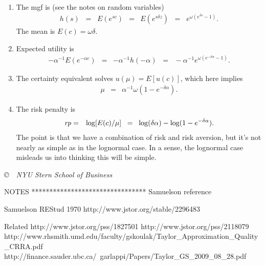 \begin{enumerate}
\begin{enumerate}
\item The mgf is (see the notes on random variables)
\begin{eqnarray*}
    h(s) \;\;=\;\;  E(e^{sc}) &=& E(e^{s\delta z}) \;\;=\;\;  e^{\omega (e^{\delta s} -1)} .
\end{eqnarray*}
The mean is $ E(c) = \omega\delta $.

\item Expected utility is
\begin{eqnarray*}
 - \alpha^{-1} E(e^{-\alpha c}) &=& - \alpha^{-1} h(-\alpha)
            \;\;=\;\; - \alpha^{-1} e^{\omega (e^{-\delta\alpha } -1)} .
\end{eqnarray*}

\item The certainty equivalent solves $u(\mu) = E[u(c)]$, which here implies
\begin{eqnarray*}
    \mu &=& \alpha^{-1} \omega (1- e^{-\delta \alpha}) .
\end{eqnarray*}

\item The risk penalty is
\begin{eqnarray*}
    \mbox{\em rp\/} &=& \log [E(c)/\mu]
            \;\;=\;\; \log (\delta \alpha) - \log (1- e^{-\delta \alpha}) .
\end{eqnarray*}
The point is that we have a combination of risk and risk aversion,
but it's not nearly as simple as in the lognormal case.
In a sense, the lognormal case misleads us into thinking this will be simple.
\end{enumerate}



\end{enumerate}



\vfill \centerline{\it \copyright \ \number\year \
NYU Stern School of Business}




NOTES
********************************
Samuelson reference

Samuelson REStud 1970
http://www.jstor.org/stable/2296483

Related
http://www.jstor.org/pss/1827501
http://www.jstor.org/pss/2118079
http://www.rhsmith.umd.edu/faculty/gskoulak/Taylor_Approximation_Quality_CRRA.pdf
http://finance.sauder.ubc.ca/~garlappi/Papers/Taylor_GS_2009_08_28.pdf
